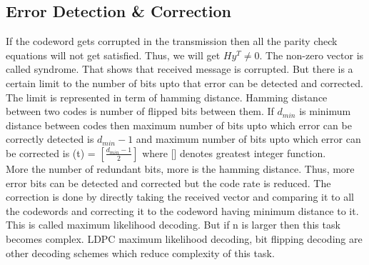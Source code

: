 \subsection{Error Detection \& Correction}

If the codeword gets corrupted in the transmission then all the parity check equations will not get satisfied. Thus, we will get $Hy^T\neq0$. The non-zero vector is called syndrome. That shows that received message is corrupted. But there is a certain limit to the number of bits upto that error can be detected and corrected.
The limit is represented in term of hamming distance. Hamming distance between two codes is number of flipped bits between them. If $d_{min}$ is minimum distance between codes then maximum number of bits upto which error can be correctly detected is $d_{min}-1$ and maximum number of bits upto which error can be corrected is
(t) = $[\frac{d_{min}-1}{2}]$
where [] denotes greatest integer function.\\
More the number of redundant bits, more is the hamming distance. Thus, more error bits can be detected and corrected but the code rate is reduced. The correction is done by directly taking the received vector and comparing it to all the codewords and correcting it to the codeword having minimum distance to it. This is called maximum likelihood decoding. But if n is larger then this task becomes complex. LDPC maximum likelihood decoding, bit flipping decoding are other decoding schemes which reduce complexity of this task.









